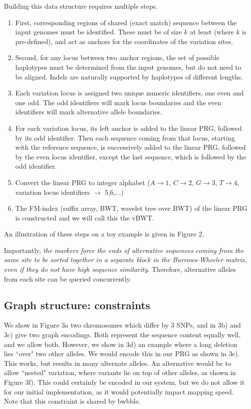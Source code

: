 \documentclass[runningheads,a4paper]{llncs}
\begin{document}
Building this data structure requires multiple steps. 
\begin{enumerate}
\item First, corresponding regions of shared (exact match) sequence between the input  genomes must be identified. These must be of size $k$ at least (where $k$ is pre-defined), and  act as anchors for the coordinates of the variation sites. 
\item Second, for any locus between two anchor regions, the set of possible haplotypes must be determined from the input genomes, but  do not need to be aligned. Indels are naturally supported by haplotypes of different lengths.
\item Each variation locus is assigned two unique numeric identifiers, one even and one odd. The odd identifiers will mark locus boundaries and the even identifiers will mark alternative allele boundaries.
\item For each variation locus, its left anchor is added to the linear PRG, followed by its odd identifier. Then each sequence coming from that locus, starting with the reference sequence, is successively added to the linear PRG, followed by the even locus identifier, except the last sequence, which is followed by the odd identifier.
\item Convert the linear PRG to integer alphabet ($A\rightarrow 1$, $C\rightarrow2$, $G\rightarrow3$, $T\rightarrow4$, variation locus identifiers $\rightarrow$ 5,6,...)
\item The FM-index (suffix array, BWT, wavelet tree over BWT) of the linear PRG is constructed and we will call this the vBWT.
\end{enumerate}

An illustration of these steps on a toy example is given in Figure 2.


Importantly, \textit{the markers force the ends of alternative sequences coming from the same site to be sorted together in a separate block in the Burrows-Wheeler matrix, even if they do not have high sequence similarity}. Therefore, alternative alleles from each site can be queried concurrently.


\subsection{Graph structure: constraints}


We show in Figure 3a two chromosomes which differ by 3 SNPs, and in 3b) and 3c) give two graph encodings. Both represent the sequence content equally well, and we allow both.
 However, we show in 3d) an example where a long deletion lies ``over" two other alleles. We would encode this in our PRG as shown in 3e). This works, but results in many alternate alleles. An alternative would be to allow ``nested" variation, where variants lie on top of other alleles, as shown in Figure 3f). This could certainly be encoded in our system, but we do not allow it for our initial implementation, as it would potentially impact mapping speed. Note that this constraint is shared by bwbble.
\end{document}
